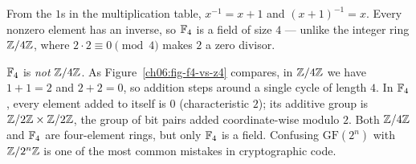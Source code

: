 From the $1$s in the multiplication table, $x^{-1} = x+1$ and $(x+1)^{-1} = x$.
Every nonzero element has an inverse, so $\mathbb{F}_4$ is a field of size $4$ ---
unlike the integer ring $\mathbb{Z}/4\mathbb{Z}$, where $2 \cdot 2 \equiv 0 \pmod 4$ makes $2$
a zero divisor.

\begin{trapbox}
$\mathbb{F}_4$ is \emph{not} $\mathbb{Z}/4\mathbb{Z}$. As Figure~\ref{ch06:fig-f4-vs-z4} compares, in
$\mathbb{Z}/4\mathbb{Z}$ we have $1+1 = 2$ and $2+2 = 0$, so addition steps around a single
cycle of length $4$. In $\mathbb{F}_4$, every element added to itself is $0$
(characteristic $2$); its additive group is $\mathbb{Z}/2\mathbb{Z} \times \mathbb{Z}/2\mathbb{Z}$, the group
of bit pairs added coordinate-wise modulo $2$. Both $\mathbb{Z}/4\mathbb{Z}$ and $\mathbb{F}_4$ are
four-element rings, but only $\mathbb{F}_4$ is a field. Confusing $\mathrm{GF}(2^n)$
with $\mathbb{Z}/2^n\mathbb{Z}$ is one of the most common mistakes in cryptographic code.
\end{trapbox}

